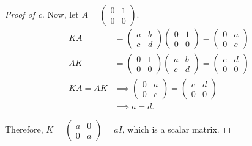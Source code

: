 \documentclass[../hw3]{subfiles}
\begin{document}
\begin{proof}[Proof of c]
	Now, let $A = \begin{pmatrix} 0&1\\0&0 \end{pmatrix} $.
	\begin{align*}
		KA    & = \begin{pmatrix} a & b \\ c & d \end{pmatrix}\begin{pmatrix} 0&1 \\ 0 & 0 \end{pmatrix} = \begin{pmatrix} 0&a \\ 0&c \end{pmatrix}   \\
		AK    & = \begin{pmatrix} 0&1 \\ 0 & 0 \end{pmatrix} \begin{pmatrix} a & b \\ c & d \end{pmatrix}= \begin{pmatrix} c&d \\ 0 & 0 \end{pmatrix} \\
		KA=AK & \implies \begin{pmatrix} 0&a \\ 0&c \end{pmatrix} = \begin{pmatrix} c&d \\ 0 & 0 \end{pmatrix}                                        \\
		      & \implies a=d
		.\end{align*}

	Therefore, $K= \begin{pmatrix} a&0\\0&a \end{pmatrix} =aI$, which is a scalar matrix.
\end{proof}
\end{document}
